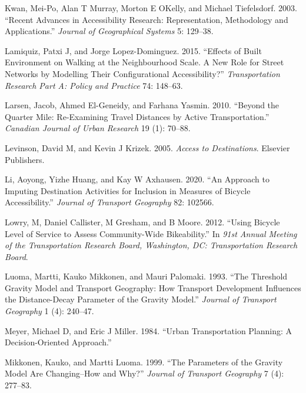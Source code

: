 \documentclass[preprint, 3p,
authoryear]{elsarticle} %
\newlength{\cslhangindent}
\newlength{\cslentryspacingunit} %
\newenvironment{CSLReferences}[2] %
 {%
  \setlength{\parindent}{0pt}
  \ifodd #1
  \let\oldpar\par
  \def\par{\hangindent=\cslhangindent\oldpar}
  \fi
  \setlength{\parskip}{#2\cslentryspacingunit}
 }%
 {}
\begin{document}
\begin{CSLReferences}{1}{0}
\leavevmode{}%
Kwan, Mei-Po, Alan T Murray, Morton E OKelly, and Michael Tiefelsdorf.
2003. {``Recent Advances in Accessibility Research: Representation,
Methodology and Applications.''} \emph{Journal of Geographical Systems}
5: 129--38.

\leavevmode{}%
Lamiquiz, Patxi J, and Jorge Lopez-Dominguez. 2015. {``Effects of Built
Environment on Walking at the Neighbourhood Scale. A New Role for Street
Networks by Modelling Their Configurational Accessibility?''}
\emph{Transportation Research Part A: Policy and Practice} 74: 148--63.

\leavevmode{}%
Larsen, Jacob, Ahmed El-Geneidy, and Farhana Yasmin. 2010. {``Beyond the
Quarter Mile: Re-Examining Travel Distances by Active Transportation.''}
\emph{Canadian Journal of Urban Research} 19 (1): 70--88.

\leavevmode{}%
Levinson, David M, and Kevin J Krizek. 2005. \emph{Access to
Destinations}. Elsevier Publishers.

\leavevmode{}%
Li, Aoyong, Yizhe Huang, and Kay W Axhausen. 2020. {``An Approach to
Imputing Destination Activities for Inclusion in Measures of Bicycle
Accessibility.''} \emph{Journal of Transport Geography} 82: 102566.

\leavevmode{}%
Lowry, M, Daniel Callister, M Gresham, and B Moore. 2012. {``Using
Bicycle Level of Service to Assess Community-Wide Bikeability.''} In
\emph{91st Annual Meeting of the Transportation Research Board,
Washington, DC: Transportation Research Board}.

\leavevmode{}%
Luoma, Martti, Kauko Mikkonen, and Mauri Palomaki. 1993. {``The
Threshold Gravity Model and Transport Geography: How Transport
Development Influences the Distance-Decay Parameter of the Gravity
Model.''} \emph{Journal of Transport Geography} 1 (4): 240--47.

\leavevmode{}%
Meyer, Michael D, and Eric J Miller. 1984. {``Urban Transportation
Planning: A Decision-Oriented Approach.''}

\leavevmode{}%
Mikkonen, Kauko, and Martti Luoma. 1999. {``The Parameters of the
Gravity Model Are Changing--How and Why?''} \emph{Journal of Transport
Geography} 7 (4): 277--83.


\end{CSLReferences}
\end{document}
